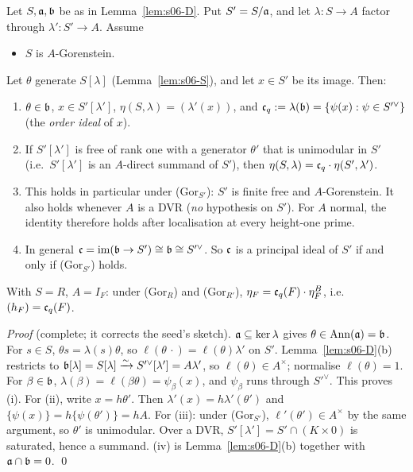 \begin{theorem}\label{thm:s06-E}
Let $S,\mathfrak{a},\mathfrak{b}$ be as in Lemma~\ref{lem:s06-D}. Put $S'=S/\mathfrak{a}$, and let $\lambda:S\to A$ factor through $\lambda':S'\to A$. Assume
\begin{itemize}
\item[(Gor$_S$)] $S$ is $A$-Gorenstein.
\end{itemize}
Let $\theta$ generate $S[\lambda]$ (Lemma~\ref{lem:s06-S}), and let $x\in S'$ be its image. Then:
\begin{enumerate}[label=(\roman*)]
\item $\theta\in\mathfrak{b}$, $x\in S'[\lambda']$, $\eta(S,\lambda)=(\lambda'(x))$, and $\mathfrak{c}_q:=\lambda(\mathfrak{b})=\{\psi(x):\psi\in S'^\vee\}$ (the
  \emph{order ideal} of $x$).
\item If $S'[\lambda']$ is free of rank one with a generator $\theta'$ that is unimodular in $S'$ (i.e.\ $S'[\lambda']$ is an
  $A$-direct summand of $S'$), then $\eta(S,\lambda)=\mathfrak{c}_q\cdot\eta(S',\lambda')$.
\item This holds in particular under (Gor$_{S'}$): $S'$ is finite free and $A$-Gorenstein. It also holds whenever $A$ is a DVR
  (\emph{no} hypothesis on $S'$). For $A$ normal, the identity therefore holds after localisation at every height-one prime.
\item In general $\mathfrak{c}=\mathrm{im}(\mathfrak{b}\to S')\cong\mathfrak{b}\cong S'^\vee$. So $\mathfrak{c}$ is a principal ideal of $S'$ if and only if
  (Gor$_{S'}$) holds.
\end{enumerate}
With $S=R$, $A=I_F$: under (Gor$_R$) and (Gor$_{R'}$), $\eta_F=\mathfrak{c}_q(F)\cdot\eta^B_F$, i.e.\ $(h_F)=\mathfrak{c}_q(F)$. \stproved{}
\end{theorem}
\noindent\emph{Proof} (complete; it corrects the seed's sketch). $\mathfrak{a}\subseteq\ker\lambda$ gives $\theta\in\operatorname{Ann}(\mathfrak{a})=\mathfrak{b}$.
For $s\in S$, $\theta s=\lambda(s)\theta$, so $\ell(\theta\,\cdot)=\ell(\theta)\lambda'$ on $S'$. Lemma~\ref{lem:s06-D}(b) restricts to
$\mathfrak{b}[\lambda]=S[\lambda]\xrightarrow\sim S'^\vee[\lambda']=A\lambda'$, so $\ell(\theta)\in A^\times$; normalise $\ell(\theta)=1$.
For $\beta\in\mathfrak{b}$, $\lambda(\beta)=\ell(\beta\theta)=\psi_\beta(x)$, and $\psi_\beta$ runs through $S'^\vee$. This proves (i). For (ii),
write $x=h\theta'$. Then $\lambda'(x)=h\lambda'(\theta')$ and $\{\psi(x)\}=h\{\psi(\theta')\}=hA$. For (iii): under (Gor$_{S'}$),
$\ell'(\theta')\in A^\times$ by the same argument, so $\theta'$ is unimodular. Over a DVR, $S'[\lambda']=S'\cap(K\times0)$ is
saturated, hence a summand. (iv) is Lemma~\ref{lem:s06-D}(b) together with $\mathfrak{a}\cap\mathfrak{b}=0$. \qed

